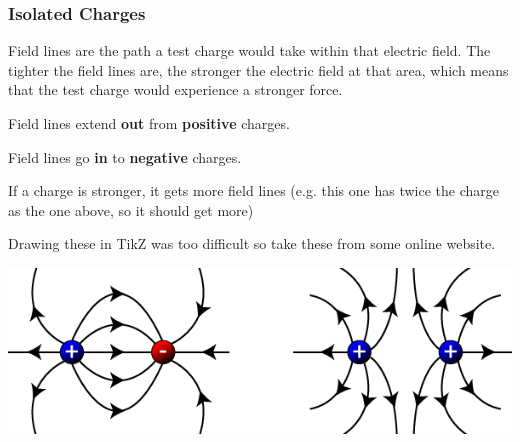 \documentclass[../main.tex]{subfiles}
\begin{document}
		\subsubsection{Isolated Charges}
		Field lines are the path a test charge would take within that electric field. The tighter the field lines are, the stronger the electric field at that area, which means that the test charge would experience a stronger force.
		
		Field lines extend \textbf{out} from \textbf{positive} charges.
		\begin{center}
		\end{center}
		Field lines go \textbf{in} to \textbf{negative} charges.
		\begin{center}
		\end{center}
		
		If a charge is stronger, it gets more field lines (e.g. this one has twice the charge as the one above, so it should get more)
		\begin{center}
		\end{center}
		
		Drawing these in TikZ was too difficult so take these from some online website.
		\begin{center}
			\includegraphics[width=\linewidth]{graphics/electrostaticsFieldLines}
		\end{center}
	
\end{document}
